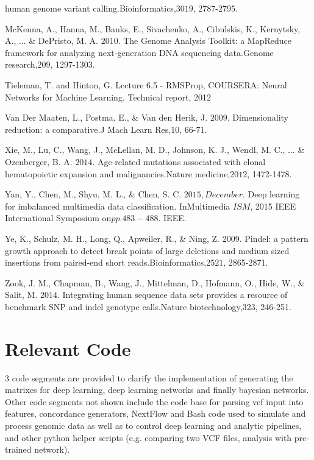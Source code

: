 \documentclass{article}
\begin{document}
\begin{list}{}{%
\setlength{\topsep}{0pt}%
\setlength{\leftmargin}{0.5in}%
\setlength{\listparindent}{-0.5in}%
\setlength{\itemindent}{-0.5in}%
\setlength{\parsep}{\parskip}%
}
human genome variant calling.Bioinformatics,30\(19\), 2787-2795.\\\item[] McKenna, A., Hanna, M., Banks, E., Sivachenko, A., Cibulskis, K., Kernytsky, A., ... \& DePristo, M. A. \(2010\). The Genome Analysis Toolkit: a MapReduce framework for analyzing next-generation DNA sequencing data.Genome research,20\(9\), 1297-1303.\\\item[] Tieleman, T. and Hinton, G. Lecture 6.5 - RMSProp, COURSERA: Neural Networks for Machine Learning. Technical report, 2012\\\item[] Van Der Maaten, L., Postma, E., \& Van den Herik, J. \(2009\). Dimensionality reduction: a comparative.J Mach Learn Res,10, 66-71.\\\item[] Xie, M., Lu, C., Wang, J., McLellan, M. D., Johnson, K. J., Wendl, M. C., ... \& Ozenberger, B. A. \(2014\). Age-related mutations associated with clonal hematopoietic expansion and malignancies.Nature medicine,20\(12\), 1472-1478.\\\item[] Yan, Y., Chen, M., Shyu, M. L., \& Chen, S. C. \(2015, December\). Deep learning for imbalanced multimedia data classification. InMultimedia \(ISM\), 2015 IEEE International Symposium on\(pp. 483-488\). IEEE.\\\item[] Ye, K., Schulz, M. H., Long, Q., Apweiler, R., \& Ning, Z. \(2009\). Pindel: a pattern growth approach to detect break points of large deletions and medium sized insertions from paired-end short reads.Bioinformatics,25\(21\), 2865-2871.\\\item[] Zook, J. M., Chapman, B., Wang, J., Mittelman, D., Hofmann, O., Hide, W., \& Salit, M. \(2014\). Integrating human sequence data sets provides a resource of benchmark SNP and indel genotype calls.Nature biotechnology,32\(3\), 246-251.\\


\end{list}

\newpage
\section{Relevant Code}
3 code segments are provided to clarify the implementation of generating the matrixes for deep learning, deep learning networks and finally bayesian networks. Other code segments not shown include the code base for parsing vcf input into features, concordance generators, NextFlow and Bash code used to simulate and process genomic data as well as to control deep learning and analytic pipelines, and other python helper scripts (e.g. comparing two VCF files, analysis with pre-trained network).
\end{document}
